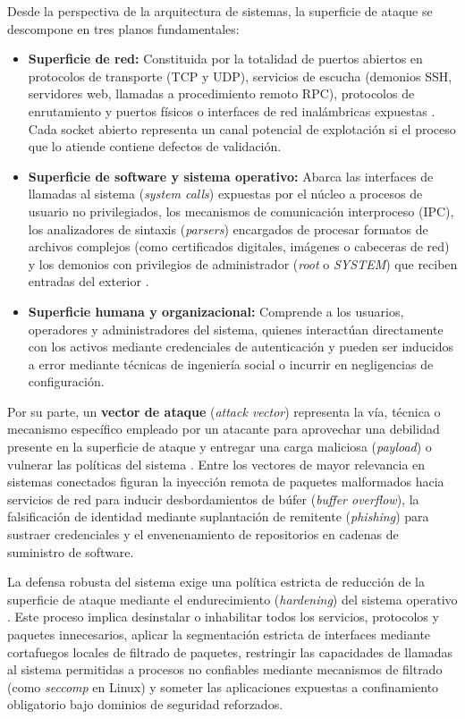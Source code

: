 \documentclass[12pt]{article}
\begin{document}
Desde la perspectiva de la arquitectura de sistemas, la superficie de ataque se descompone en tres planos fundamentales:
\begin{itemize}[noitemsep, topsep=2pt]
    \item \textbf{Superficie de red:} Constituida por la totalidad de puertos abiertos en protocolos de transporte (TCP y UDP), servicios de escucha (demonios SSH, servidores web, llamadas a procedimiento remoto RPC), protocolos de enrutamiento y puertos físicos o interfaces de red inalámbricas expuestas \parencite[\S 15.5, p.\ 682]{stallings2018operating}. Cada socket abierto representa un canal potencial de explotación si el proceso que lo atiende contiene defectos de validación.
    \item \textbf{Superficie de software y sistema operativo:} Abarca las interfaces de llamadas al sistema (\textit{system calls}) expuestas por el núcleo a procesos de usuario no privilegiados, los mecanismos de comunicación interproceso (IPC), los analizadores de sintaxis (\textit{parsers}) encargados de procesar formatos de archivos complejos (como certificados digitales, imágenes o cabeceras de red) y los demonios con privilegios de administrador (\textit{root} o \textit{SYSTEM}) que reciben entradas del exterior \parencite[\S 15.1, p.\ 658]{stallings2018operating}.
    \item \textbf{Superficie humana y organizacional:} Comprende a los usuarios, operadores y administradores del sistema, quienes interactúan directamente con los activos mediante credenciales de autenticación y pueden ser inducidos a error mediante técnicas de ingeniería social o incurrir en negligencias de configuración.
\end{itemize}

Por su parte, un \textbf{vector de ataque} (\textit{attack vector}) representa la vía, técnica o mecanismo específico empleado por un atacante para aprovechar una debilidad presente en la superficie de ataque y entregar una carga maliciosa (\textit{payload}) o vulnerar las políticas del sistema \parencite[\S 15.1, p.\ 511]{silberschatz2006fundamentos}. Entre los vectores de mayor relevancia en sistemas conectados figuran la inyección remota de paquetes malformados hacia servicios de red para inducir desbordamientos de búfer (\textit{buffer overflow}), la falsificación de identidad mediante suplantación de remitente (\textit{phishing}) para sustraer credenciales y el envenenamiento de repositorios en cadenas de suministro de software.

La defensa robusta del sistema exige una política estricta de reducción de la superficie de ataque mediante el endurecimiento (\textit{hardening}) del sistema operativo \parencite[\S 15.5, p.\ 683]{stallings2018operating}. Este proceso implica desinstalar o inhabilitar todos los servicios, protocolos y paquetes innecesarios, aplicar la segmentación estricta de interfaces mediante cortafuegos locales de filtrado de paquetes, restringir las capacidades de llamadas al sistema permitidas a procesos no confiables mediante mecanismos de filtrado (como \textit{seccomp} en Linux) y someter las aplicaciones expuestas a confinamiento obligatorio bajo dominios de seguridad reforzados.
\end{document}
